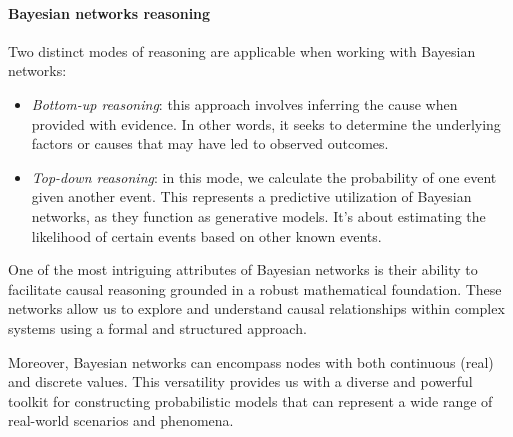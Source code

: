 \paragraph*{Bayesian networks reasoning}
Two distinct modes of reasoning are applicable when working with Bayesian networks:
\begin{itemize}
    \item \textit{Bottom-up reasoning}: this approach involves inferring the cause when provided with evidence. 
        In other words, it seeks to determine the underlying factors or causes that may have led to observed outcomes.
    \item \textit{Top-down reasoning}: in this mode, we calculate the probability of one event given another event. 
        This represents a predictive utilization of Bayesian networks, as they function as generative models. 
        It's about estimating the likelihood of certain events based on other known events.
\end{itemize}
One of the most intriguing attributes of Bayesian networks is their ability to facilitate causal reasoning grounded in a robust mathematical foundation. 
These networks allow us to explore and understand causal relationships within complex systems using a formal and structured approach.

Moreover, Bayesian networks can encompass nodes with both continuous (real) and discrete values. 
This versatility provides us with a diverse and powerful toolkit for constructing probabilistic models that can represent a wide range of real-world scenarios and phenomena.